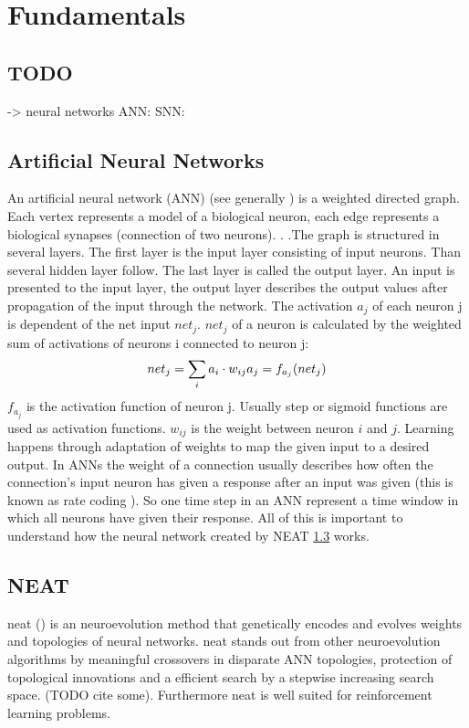 
\chapter{Fundamentals}\label{Basics}
\section{TODO}
-> neural networks
ANN: 
SNN:
\section{Artificial Neural Networks}
An artificial neural network (ANN) (see generally \cite{zell1994simulation} ) is a weighted directed graph. Each vertex represents a model of a biological neuron, each edge represents a biological synapses (connection of two neurons). .  .The graph is structured in several layers. The first layer is the input layer consisting of input neurons. Than several hidden layer follow. The last layer is called the output layer. An input is presented to the input layer, the output layer describes the output values after propagation of the input through the network. The activation $a_j$ of each neuron j  is dependent of the net input $net_j$. $net_j$ of a neuron is calculated by the weighted sum of activations of neurons i connected to neuron j:
\begin{equation*}
	net_j = \displaystyle\sum_{i} a_i \cdot w_{ij}\\
	a_j = f_{a_j}(net_j)
\end{equation*}
$f_{a_j}$ is the activation function of neuron j. Usually step or sigmoid functions are used as activation functions. $w_{ij}$ is the weight between neuron $i$ and $j$.
Learning happens through adaptation of weights to map the given input to a desired output. In ANNs the weight of a connection usually describes how often the connection's input neuron has given a response after an input was given (this is known as rate coding \cite{sebastianMasterThesis}). So one time step in an ANN represent a time window in which all neurons have given their response. All of this is important to understand how the neural network created by NEAT \ref{NEAT} works.




\section{NEAT}\label{NEAT} %
\Gls{neat} (\cite{NEAT}) is an neuroevolution method that genetically encodes and evolves weights and topologies of neural networks. \gls{neat} stands out from other neuroevolution algorithms by meaningful crossovers in disparate ANN topologies, protection of topological innovations and a efficient search by a stepwise increasing search space. (TODO cite some). Furthermore \gls{neat} is well suited for reinforcement learning problems. 

